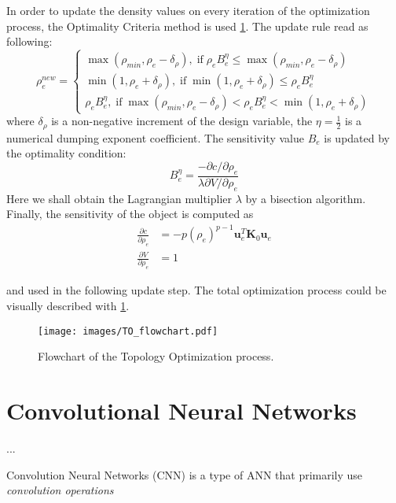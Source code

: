 In order to update the density values on every iteration of the optimization process, the Optimality Criteria method is used \ref{}.
The update rule read as following:
\[ \rho^{new}_{e} = 
\begin{cases}
	\max(\rho_{min},\rho_{e}-\delta_{\rho}) , \; \mathrm{if} \; \rho_{e}B^{\eta}_{e} \leq \max(\rho_{min},\rho_{e}-\delta_{\rho}) \\
	\min(1,\rho_{e}+\delta_{\rho}), \; \mathrm{if} \; \min(1,\rho_{e}+\delta_{\rho}) \leq \rho_{e}B^{\eta}_{e}\\
	\rho_{e}B^{\eta}_{e}, \; \mathrm{if} \; \max(\rho_{min},\rho_{e}-\delta_{\rho}) < \rho_{e}B^{\eta}_{e} < \min(1,\rho_{e}+\delta_{\rho}) 
\end{cases}
\]
where $\delta_{\rho}$ is a non-negative increment of the design variable, the $\eta = \frac{1}{2} $ is a numerical dumping exponent coefficient.
The sensitivity value $B_{e}$ is updated by the optimality condition:
\begin{equation}
	B^{\eta}_{e} = \frac{-\partial c / \partial \rho_{e}}{\lambda \partial V / \partial \rho_{e}}
\end{equation}
Here we shall obtain the Lagrangian multiplier $\lambda$ by a bisection algorithm.
Finally, the sensitivity of the object is computed as 
\begin{align*}
	\frac{\partial c}{\partial \rho_{e}} & = -p(\rho_{e})^{p-1} \mathbf{u}^{T}_{e} \mathbf{K}_{0} \mathbf{u}_{e}\\
	\frac{\partial V}{\partial \rho_{e}} & = 1
\end{align*}

and used in the following update step.
The total optimization process could be visually described with \ref{fig:to_flow}.

\begin{figure}[]
	\centering
	\texttt{[image: images/TO\_flowchart.pdf]}
	\caption{Flowchart of the Topology Optimization process.}
	\label{fig:to_flow}
\end{figure}




\section{Convolutional Neural Networks}

...

Convolution Neural Networks (CNN) is a type of ANN that primarily use \textit{convolution operations}

